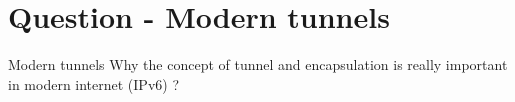 \section{Question - Modern tunnels}

\begin{questionBox}{Modern tunnels}
    Why the concept of tunnel and encapsulation is really important in modern internet (IPv6) ?    
\end{questionBox}
